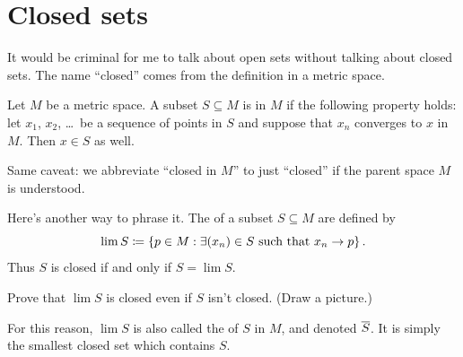 
\section{Closed sets}
It would be criminal for me to talk about open sets
without talking about closed sets.
The name ``closed'' comes from the definition in a metric space.
\begin{definition}
	Let $M$ be a metric space.
	A subset $S \subseteq M$ is  in $M$ if the following property holds:
	let $x_1$, $x_2$, \dots\ be a sequence of points in $S$
	and suppose that $x_n$ converges to $x$ in $M$.
	Then $x \in S$ as well.
\end{definition}
\begin{abuse}
	Same caveat: we abbreviate ``closed in $M$'' to just ``closed''
	if the parent space $M$ is understood.
\end{abuse}
Here's another way to phrase it.
The  of a subset $S \subseteq M$ are defined by
\[ \lim S \coloneqq \left\{ p \in M :
	\exists (x_n) \in S \text{ such that } x_n \to p \right\}. \]
Thus $S$ is closed if and only if $S = \lim S$.

\begin{exercise}
	Prove that $\lim S$ is closed even if $S$ isn't closed. (Draw a picture.)
\end{exercise}
For this reason, $\lim S$ is also called the
 of $S$ in $M$, and denoted $\overline S$.
It is simply the smallest closed set which contains $S$.

